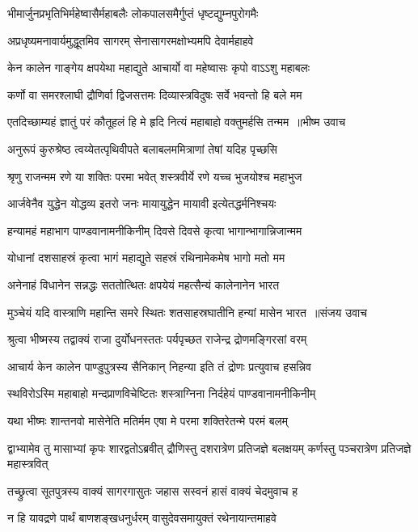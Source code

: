 \twolineshloka
{भीमार्जुनप्रभृतिभिर्महेष्वासैर्महाबलैः}
{लोकपालसमैर्गुप्तं धृष्टद्युम्नपुरोगमैः}


\twolineshloka
{अप्रधृष्यमनावार्यमुद्धूतमिव सागरम्}
{सेनासागरमक्षोभ्यमपि देवार्महाहवे}


\twolineshloka
{केन कालेन गाङ्गेय क्षपयेथा महाद्युते}
{आचार्यो वा महेष्वासः कृपो वाऽऽशु महाबलः}


\twolineshloka
{कर्णो वा समरश्लाघी द्रौणिर्वा द्विजसत्तमः}
{दिव्यास्त्रविदुषः सर्वे भवन्तो हि बले मम}


\threelineshloka
{एतदिच्छाम्यहं ज्ञातुं परं कौतूहलं हि मे}
{हृदि नित्यं महाबाहो वक्तुमर्हसि तन्मम ॥भीष्म उवाच}
{}


\twolineshloka
{अनुरूपं कुरुश्रेष्ठ त्वय्येतत्पृथिवीपते}
{बलाबलममित्राणां तेषां यदिह पृच्छसि}


\twolineshloka
{श्रृणु राजन्मम रणे या शक्तिः परमा भवेत्}
{शस्त्रवीर्ये रणे यच्च भुजयोश्च महाभुज}


\twolineshloka
{आर्जवेनैव युद्धेन योद्धव्य इतरो जनः}
{मायायुद्धेन मायावी इत्येतद्धर्मनिश्चयः}


\twolineshloka
{हन्यामहं महाभाग पाण्डवानामनीकिनीम्}
{दिवसे दिवसे कृत्वा भागान्भागान्निजान्मम}


\twolineshloka
{योधानां दशसाहस्रं कृत्वा भागं महाद्युते}
{सहस्रं रथिनामेकमेष भागो मतो मम}


\twolineshloka
{अनेनाहं विधानेन सन्नद्धः सततोत्थितः}
{क्षपयेयं महत्सैन्यं कालेनानेन भारत}


\threelineshloka
{मुञ्चेयं यदि वास्त्राणि महान्ति समरे स्थितः}
{शतसाहस्रघातीनि हन्यां मासेन भारत ॥संजय उवाच}
{}


\twolineshloka
{श्रुत्वा भीष्मस्य तद्वाक्यं राजा दुर्योधनस्ततः}
{पर्यपृच्छत राजेन्द्र द्रोणमङ्गिरसां वरम्}


\twolineshloka
{आचार्य केन कालेन पाण्डुपुत्रस्य सैनिकान्}
{निहन्या इति तं द्रोणः प्रत्युवाच हसन्निव}


\twolineshloka
{स्थविरोऽस्मि महाबाहो मन्दप्राणविचेष्टितः}
{शस्त्राग्निना निर्दहेयं पाण्डवानामनीकिनीम्}


\twolineshloka
{यथा भीष्मः शान्तनवो मासेनेति मतिर्मम}
{एषा मे परमा शक्तिरेतन्मे परमं बलम्}


\threelineshloka
{द्वाभ्यामेव तु मासाभ्यां कृपः शारद्वतोऽब्रवीत्}
{द्रौणिस्तु दशरात्रेण प्रतिजज्ञे बलक्षयम्}
{कर्णस्तु पञ्चरात्रेण प्रतिजज्ञे महास्त्रवित्}


\twolineshloka
{तच्छ्रुत्वा सूतपुत्रस्य वाक्यं सागरगासुतः}
{जहास सस्वनं हासं वाक्यं चेदमुवाच ह}


\twolineshloka
{न हि यावद्रणे पार्थं बाणशङ्खधनुर्धरम्}
{वासुदेवसमायुक्तं रथेनायान्तमाहवे}


